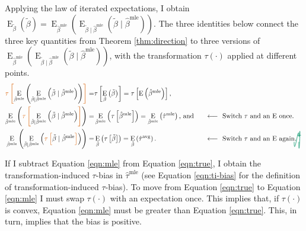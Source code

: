 \documentclass[12pt]{article}
\DeclareMathOperator*{\E}{\text{E}}
\newcommand{\tikzmark}[1]{\tikz[overlay,remember picture] \node (#1) {};}
\newcommand{\DrawBox}[2]{%
  \begin{tikzpicture}[overlay,remember picture]
    \draw[->,shorten >= 6pt, shorten <= 2pt, out=-90, in=85, distance=1.3cm, color2, thick] (MarkA.east) to (MarkB.east);
    \draw[->,shorten >= 6pt, shorten <= 2pt, out=-90, in=90, distance=1cm, color2, thick] (MarkC.west) to (MarkD.east);
  \end{tikzpicture}
}
\newcommand{\justif}[2]{&{#1}&\text{#2}}
\begin{document}
Applying the law of iterated expectations, I obtain $\E_{\tilde{\beta}} \left( \tilde{\beta} \right) = \E_{\hat{\beta}^\text{mle}}\left( \E_{\tilde{\beta} \mid \hat{\beta}^\text{mle}} (\tilde{\beta} \mid \hat{\beta}^\text{mle}) \right)$.
The three identities below connect the three key quantities from Theorem \ref{thm:direction} to three versions of $\E_{\hat{\beta}^\text{mle}}\left( \E_{\tilde{\beta} \mid \hat{\beta}^\text{mle}} (\tilde{\beta} \mid \hat{\beta}^\text{mle}) \right)$, with the transformation $\tau(\cdot)$ applied at different points.
\small
\begin{alignat}{2}
 \color{color1} \tikzmark{MarkA}\tau \left[ \normalcolor \E_{\hat{\beta}^\text{mle}}\left( \E_{\tilde{\beta} \mid \hat{\beta}^\text{mle}} \left( \tilde{\beta} \mid \hat{\beta}^\text{mle} \right) \right) \color{color1} \right] \normalcolor =&  \tau \left[ \E_{\tilde{\beta}} \left( \tilde{\beta} \right) \right] = \tau \left[\E\left( \hat{\beta}^\text{mle} \right) \right]\text{,} \label{eqn:true}\\
 \E_{\hat{\beta}^\text{mle}}\left( \color{color1} \tikzmark{MarkB}\tau\tikzmark{MarkC} \left[ \normalcolor \E_{\tilde{\beta} \mid \hat{\beta}^\text{mle}} \left( \tilde{\beta} \mid \hat{\beta}^\text{mle} \right) \color{color1} \right] \normalcolor \right)  =&  \E_{\hat{\beta}^\text{mle}} \left( \tau \left[\hat{\beta}^\text{mle} \right] \right) =  \E_{\hat{\beta}^\text{mle}} \left(\hat{\tau}^\text{mle} \right) \text{, and} \justif{\quad}{$\longleftarrow~$ Switch $\tau$ and an $\E$ once.} \label{eqn:mle}\\
\E_{\hat{\beta}^\text{mle}}\left( \E_{\tilde{\beta} \mid \hat{\beta}^\text{mle}} \left( \color{color1} \tikzmark{MarkD}\tau \left[ \normalcolor \tilde{\beta} \mid \hat{\beta}^\text{mle} \color{color1} \right] \normalcolor \right) \right)  =&
\E_{\tilde{\beta}} \left( \tau \left[\tilde{\beta} \right] \right)  =
\E_{\tilde{\beta}} \left(\hat{\tau}^\text{avg} \right) \text{.}\justif{\quad}{$\longleftarrow~$ Switch $\tau$ and an $\E$ again.}\label{eqn:avg}\DrawBox{red}{blue}
\end{alignat}
\normalsize

If I subtract Equation \ref{eqn:mle} from Equation \ref{eqn:true}, I obtain the transformation-induced $\tau$-bias in $\hat{\tau}^\text{mle}$ (see Equation \ref{eqn:ti-bias} for the definition of transformation-induced $\tau$-bias).
To move from Equation \ref{eqn:true} to Equation \ref{eqn:mle} I must swap $\tau(\cdot)$ with an expectation once.
This implies that, if $\tau(\cdot)$ is convex, Equation \ref{eqn:mle} must be greater than Equation \ref{eqn:true}.
This, in turn, implies that the bias is positive.
\end{document}
